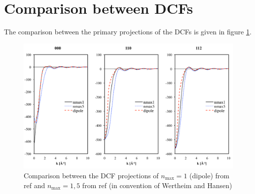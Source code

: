 \section{Comparison between DCFs\label{subsec:Comparison-with-non-coupling}}

The comparison between the primary projections of the \acs{DCF}s
is given in figure \ref{fig:Comparison-dcf-ref}.

\begin{figure}[H]
\begin{centering}
\includegraphics[width=1\columnwidth]{_figure/results/dcf}
\par\end{centering}
\caption[Comparison between \acs{DCF} projections]{Comparison between the \acs{DCF} projections of $n_{\max}=1$ (dipole)
from ref \citep{zhao_accurate_2013} and $n_{\max}=1,5$ from ref
\citep{puibasset_bridge_2012} (in convention of Wertheim and Hansen)\label{fig:Comparison-dcf-ref}}
\end{figure}

